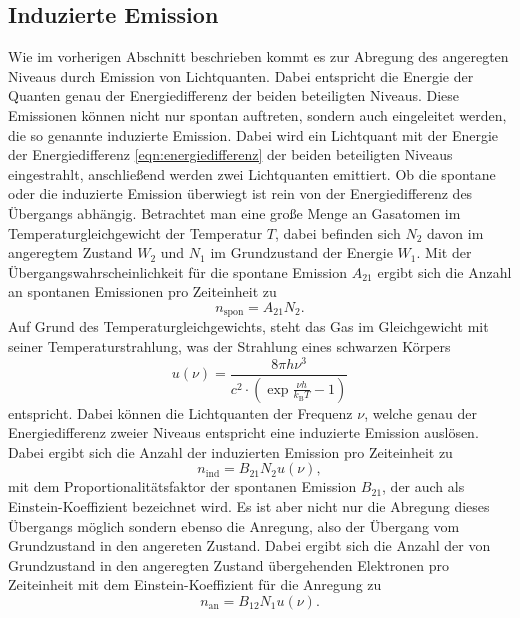 \subsection{Induzierte Emission}
\label{sec:emission}
Wie im vorherigen Abschnitt beschrieben kommt es zur Abregung des angeregten
Niveaus durch Emission von Lichtquanten. Dabei entspricht die Energie der Quanten genau der 
Energiedifferenz der beiden beteiligten Niveaus. Diese Emissionen können nicht nur
spontan auftreten, sondern auch eingeleitet werden, die so genannte induzierte Emission.
Dabei wird ein Lichtquant mit der Energie der Energiedifferenz \eqref{eqn:energiedifferenz} der beiden beteiligten 
Niveaus eingestrahlt, anschließend werden zwei Lichtquanten emittiert. Ob die spontane
oder die induzierte Emission  überwiegt ist rein von der Energiedifferenz des Übergangs abhängig.
Betrachtet man eine große Menge an Gasatomen im Temperaturgleichgewicht der Temperatur $T$, dabei befinden 
sich $N_2$ davon im angeregtem Zustand $W_2$ und $N_1$ im Grundzustand der Energie $W_1$.
Mit der Übergangswahrscheinlichkeit für die spontane Emission $A_{21}$ ergibt sich die Anzahl an 
spontanen Emissionen pro Zeiteinheit zu
\begin{equation*}
  n_\text{spon} = A_{21} N_2.
\end{equation*}
Auf Grund des Temperaturgleichgewichts, steht das Gas im Gleichgewicht mit seiner
Temperaturstrahlung, was der Strahlung eines schwarzen Körpers
\begin{equation*}
  u(\nu) = \frac{8 \pi h \nu^3}{c^2 \cdot \left(\exp{\frac{\nu h}{k_\text{B} T}} -1 \right)}
\end{equation*}
entspricht. Dabei können die Lichtquanten der Frequenz $\nu$, welche genau der Energiedifferenz zweier Niveaus entspricht
eine induzierte Emission auslösen. Dabei ergibt sich die Anzahl der induzierten Emission pro Zeiteinheit zu 
\begin{equation*}
  n_\text{ind} = B_{21} N_2 u(\nu),
\end{equation*}
mit dem Proportionalitätsfaktor der spontanen Emission $B_{21}$, der auch als Einstein-Koeffizient bezeichnet wird.
Es ist aber nicht nur die Abregung dieses Übergangs möglich sondern ebenso die Anregung, also der Übergang
vom Grundzustand in den angereten Zustand. Dabei ergibt sich die Anzahl der von Grundzustand in den angeregten Zustand
übergehenden Elektronen pro Zeiteinheit mit dem Einstein-Koeffizient für die Anregung zu
\begin{equation*}
  n_\text{an} = B_{12} N_1 u(\nu).
\end{equation*}
